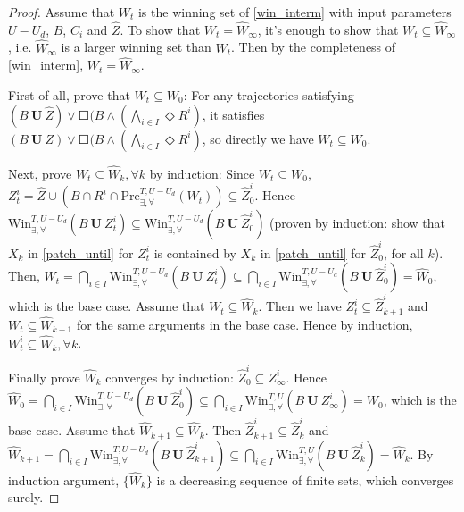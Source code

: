 \begin{proof}
	Assume that $ W_t $ is the winning set of \eqref{win_interm} with input parameters $ U-U_d $, $ B $, $ C_i $ and $ \widehat{Z} $. To show that $ W_t=\widehat{W}_\infty $, it's enough to show that $ W_t\subseteq \widehat{W}_\infty $, i.e. $ \widehat{W}_\infty $ is a larger winning set than $ W_t $. Then by the completeness of \eqref{win_interm}, $ W_t=\widehat{W}_\infty $. 
	
	First of all, prove that $ W_t \subseteq W_0 $: For any trajectories satisfying $ (B\mathbf{\ U\ }\widehat{Z})\vee \Square(B\wedge (\bigwedge_{i\in I} \Diamond R^i) $, it satisfies $  (B\mathbf{\ U\ }Z)\vee \Square(B\wedge (\bigwedge_{i\in I} \Diamond R^i) $, so directly we have $ W_t\subseteq W_0 $. 
	
	Next, prove $ W_t\subseteq \widehat{W}_k, \forall k $ by induction: Since $ W_t\subseteq W_0 $, $ Z_t^i =\widehat{Z}\cup (B\cap R^i\cap \text{Pre}_{\exists,\forall}^{T,U-U_d}(W_t)) \subseteq \widehat{Z}_0^i$. Hence $ \text{Win}_{\exists,\forall}^{T,U-U_d}(B\mathbf{\ U\ }Z_t^i)\subseteq  \text{Win}_{\exists,\forall}^{T,U-U_d}(B\mathbf{\ U\ }\widehat{Z}_0^i) $ (proven by induction: show that $ X_k $ in \eqref{patch_until} for $ Z_t^i $ is contained by $ X_k $ in \eqref{patch_until} for $ \widehat{Z}_0^i $, for all $ k $). Then, $ W_t = \bigcap_{i\in I} \text{Win}_{\exists,\forall}^{T,U-U_d} (B\mathbf{\ U\ } Z_{t}^i)\subseteq  \bigcap_{i\in I} \text{Win}_{\exists,\forall}^{T,U-U_d}(B\mathbf{\ U\ }\widehat{Z}_0^i)  = \widehat{W}_0$, which is the base case. Assume that $ W_t\subseteq \widehat{W}_k $. Then we have $ Z_t^i \subseteq \widehat{Z}_{k+1}^i $ and $ W_t\subseteq \widehat{W}_{k+1} $ for the same arguments in the base case. Hence by induction, $ W_t^i \subseteq \widehat{W}_{k}, \forall k $. 
	
	Finally prove $ \widehat{W}_{k} $ converges by induction: $ \widehat{Z}_0^i \subseteq Z_{\infty}^i $. Hence $ \widehat{W}_0 =\bigcap_{i\in I} \text{Win}_{\exists,\forall}^{T,U-U_d}(B\mathbf{\ U\ }\widehat{Z}_0^i)\subseteq \bigcap_{i\in I} \text{Win}_{\exists,\forall}^{T,U}(B\mathbf{\ U\ }Z_{\infty}^i) = W_0 $, which is the base case. Assume that $ \widehat{W}_{k+1} \subseteq \widehat{W}_k $.  Then $ \widehat{Z}_{k+1}^i\subseteq \widehat{Z}_{k}^i  $ and $ \widehat{W}_{k+1} =\bigcap_{i\in I} \text{Win}_{\exists,\forall}^{T,U-U_d}(B\mathbf{\ U\ }\widehat{Z}_{k+1}^i)\subseteq \bigcap_{i\in I} \text{Win}_{\exists,\forall}^{T,U}(B\mathbf{\ U\ }\widehat{Z}_{k}^i) = \widehat{W}_k $. By induction argument, $ \{\widehat{W}_k\} $ is a decreasing sequence of finite sets, which converges surely.
\end{proof}

